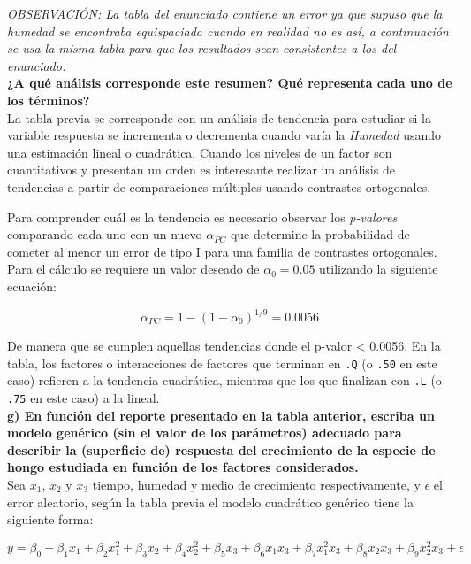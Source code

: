 \documentclass[11pt]{article}
\begin{document}
\emph{OBSERVACIÓN: La tabla del enunciado contiene un error ya que
supuso que la humedad se encontraba equispaciada cuando en realidad no
es así, a continuación se usa la misma tabla para que los resultados sean consistentes a los del enunciado.}\\
    
    \textbf{¿A qué análisis corresponde este resumen? Qué representa cada uno de los términos?}\\

La tabla previa se corresponde con un análisis de tendencia para
estudiar si la variable respuesta se incrementa o decrementa cuando
varía la \emph{Humedad} usando una estimación lineal o cuadrática. 
Cuando los niveles de un factor son cuantitativos y presentan un orden
es interesante realizar un análisis de tendencias a partir de comparaciones múltiples usando contrastes ortogonales.\

Para comprender cuál es la tendencia es necesario observar los
\emph{p-valores} comparando cada uno con un nuevo \(\alpha_{PC}\) que determine la probabilidad de cometer al menor un error de tipo I para una familia de contrastes ortogonales. Para el cálculo se requiere un valor deseado de \(\alpha_0 = 0.05\) utilizando la siguiente ecuación:

\[\alpha_{PC} = 1 - (1- \alpha_0)^{1/9} = 0.0056\]

De manera que se cumplen aquellas tendencias donde el p-valor < 0.0056.
En la tabla, los factores o interacciones de factores que terminan en
\texttt{.Q} (o \texttt{.50} en este caso) refieren a la tendencia cuadrática, mientras que los que finalizan con \texttt{.L} (o \texttt{.75} en este caso) a la lineal.\\

    \textbf{g) En función del reporte presentado en la tabla anterior,
escriba un modelo genérico (sin el valor de los parámetros) adecuado
para describir la (superficie de) respuesta del crecimiento de la
especie de hongo estudiada en función de los factores considerados.}\\

Sea \(x_1\), \(x_2\) y \(x_3\) tiempo, humedad y medio de crecimiento
respectivamente, y \(\epsilon\) el error aleatorio, según la tabla
previa el modelo cuadrático genérico tiene la siguiente forma:

\[y = \beta_0 + \beta_1x_1 + \beta_2x_1^2 + \beta_3x_2 + \beta_4x_2^2 + \beta_5x_3 + \beta_6 x_1 x_3 + \beta_7 x_1^2 x_3 + \beta_8 x_2 x_3 + \beta_9 x_2 ^2 x_3 + \epsilon\]
\end{document}
